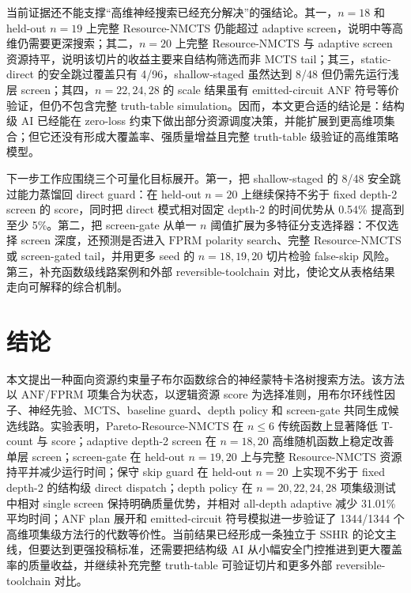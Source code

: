 \documentclass[UTF8,fontset=macnew,11pt]{ctexart}
\newcommand{\method}{Resource-NMCTS}
\newcommand{\pareto}{Pareto-Resource-NMCTS}
\newcommand{\anf}{\ensuremath{\mathrm{ANF}}}
\newcommand{\fprm}{\ensuremath{\mathrm{FPRM}}}
\newcommand{\mcts}{\ensuremath{\mathrm{MCTS}}}
\begin{document}
当前证据还不能支撑“高维神经搜索已经充分解决”的强结论。其一，$n=18$ 和 held-out $n=19$ 上完整 \method{} 仍能超过 adaptive screen，说明中等高维仍需要更深搜索；其二，$n=20$ 上完整 \method{} 与 adaptive screen 资源持平，说明该切片的收益主要来自结构筛选而非 MCTS tail；其三，static-direct 的安全跳过覆盖只有 4/96，shallow-staged 虽然达到 8/48 但仍需先运行浅层 screen；其四，$n=22,24,28$ 的 scale 结果虽有 emitted-circuit ANF 符号等价验证，但仍不包含完整 truth-table simulation。因而，本文更合适的结论是：结构级 AI 已经能在 zero-loss 约束下做出部分资源调度决策，并能扩展到更高维项集合；但它还没有形成大覆盖率、强质量增益且完整 truth-table 级验证的高维策略模型。

下一步工作应围绕三个可量化目标展开。第一，把 shallow-staged 的 8/48 安全跳过能力蒸馏回 direct guard：在 held-out $n=20$ 上继续保持不劣于 fixed depth-2 screen 的 score，同时把 direct 模式相对固定 depth-2 的时间优势从 0.54\% 提高到至少 5\%。第二，把 screen-gate 从单一 $n$ 阈值扩展为多特征分支选择器：不仅选择 screen 深度，还预测是否进入 \fprm{} polarity search、完整 \method{} 或 screen-gated tail，并用更多 seed 的 $n=18,19,20$ 切片检验 false-skip 风险。第三，补充函数级线路案例和外部 reversible-toolchain 对比，使论文从表格结果走向可解释的综合机制。

\section{结论}

本文提出一种面向资源约束量子布尔函数综合的神经蒙特卡洛树搜索方法。该方法以 \anf{}/\fprm{} 项集合为状态，以逻辑资源 score 为选择准则，用布尔环线性因子、神经先验、\mcts{}、baseline guard、depth policy 和 screen-gate 共同生成候选线路。实验表明，\pareto{} 在 $n\leq6$ 传统函数上显著降低 T-count 与 score；adaptive depth-2 screen 在 $n=18,20$ 高维随机函数上稳定改善单层 screen；screen-gate 在 held-out $n=19,20$ 上与完整 \method{} 资源持平并减少运行时间；保守 skip guard 在 held-out $n=20$ 上实现不劣于 fixed depth-2 的结构级 direct dispatch；depth policy 在 $n=20,22,24,28$ 项集级测试中相对 single screen 保持明确质量优势，并相对 all-depth adaptive 减少 31.01\% 平均时间；ANF plan 展开和 emitted-circuit 符号模拟进一步验证了 1344/1344 个高维项集级方法行的代数等价性。当前结果已经形成一条独立于 SSHR 的论文主线，但要达到更强投稿标准，还需要把结构级 AI 从小幅安全门控推进到更大覆盖率的质量收益，并继续补充完整 truth-table 可验证切片和更多外部 reversible-toolchain 对比。
\end{document}
